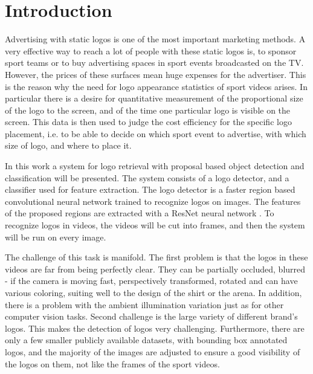 \chapter{Introduction}

Advertising with static logos is one of the most important marketing methods. A very effective way to reach a lot of people with these static logos is, to sponsor sport teams or to buy advertising spaces in sport events broadcasted on the TV. However, the prices of these surfaces mean huge expenses for the advertiser. This is the reason why the need for logo appearance statistics of sport videos arises. In particular there is a desire for quantitative measurement of the proportional size of the logo to the screen, and of the time one particular logo is visible on the screen. This data is then used to judge the cost efficiency for the specific logo placement, i.e. to be able to decide on which sport event to advertise, with which size of logo, and where to place it.

In this work a system for logo retrieval with proposal based object detection and classification will be presented. The system consists of a logo detector, and a classifier used for feature extraction. The logo detector is a faster region based convolutional neural network \cite{NIPS2015_5638} trained to recognize logos on images. The features of the proposed regions are extracted with a ResNet neural network \cite{DBLP:journals/corr/HeZRS15}. To recognize logos in videos, the videos will be cut into frames, and then the system will be run on every image.

The challenge of this task is manifold. The first problem is that the logos in these videos are far from being perfectly clear. They can be partially occluded, blurred - if the camera is moving fast, perspectively transformed, rotated and can have various coloring, suiting well to the design of the shirt or the arena. In addition, there is a problem with the ambient illumination variation just as for other computer vision tasks.
Second challenge is the large variety of different brand's logos. This makes the detection of logos very challenging.
Furthermore, there are only a few smaller publicly available datasets, with bounding box annotated logos, and the majority of the images are adjusted to ensure a good visibility of the logos on them, not like the frames of the sport videos.

